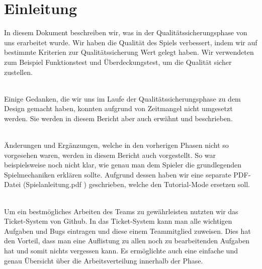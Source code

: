 %



\chapter{Einleitung}
\label{Kapitel:Einleitung}

In diesem Dokument beschreiben wir, was in der Qualitätssicherungsphase von uns erarbeitet wurde. %
Wir haben die Qualität des Spiels verbessert, indem wir auf bestimmte Kriterien zur Qualitätssicherung Wert gelegt haben. Wir verwendeten zum Beispiel Funktionstest und Überdeckungstest, um die Qualität sicher zustellen.\\~ %

Einige Gedanken, die wir uns im Laufe der Qualitätssicherungsphase zu dem Design gemacht haben, konnten aufgrund von Zeitmangel nicht umgesetzt werden. Sie werden in diesem Bericht aber auch erwähnt und beschrieben.\\~


Änderungen und Ergänzungen, welche in den vorherigen Phasen nicht so vorgesehen waren, werden in diesem Bericht auch vorgestellt. So war beispielsweise noch nicht klar, wie genau man dem Spieler die grundlegenden %
 Spielmechaniken erklären sollte. Aufgrund dessen haben wir eine separate PDF-Datei (\glqq Spielanleitung.pdf \grqq) geschrieben, welche den Tutorial-Mode ersetzen soll.\\~

Um ein bestmögliches Arbeiten des Teams zu gewährleisten nutzten wir das Ticket-System von Github. In das Ticket-System kann man alle wichtigen Aufgaben und Bugs eintragen und diese einem Teammitglied zuweisen. Dies hat den Vorteil, dass man eine Auflistung zu allen noch zu bearbeitenden Aufgaben hat und somit nichts vergessen kann. Es ermöglichte auch eine einfache und genau Übersicht über die Arbeitsverteilung innerhalb der Phase.
 











